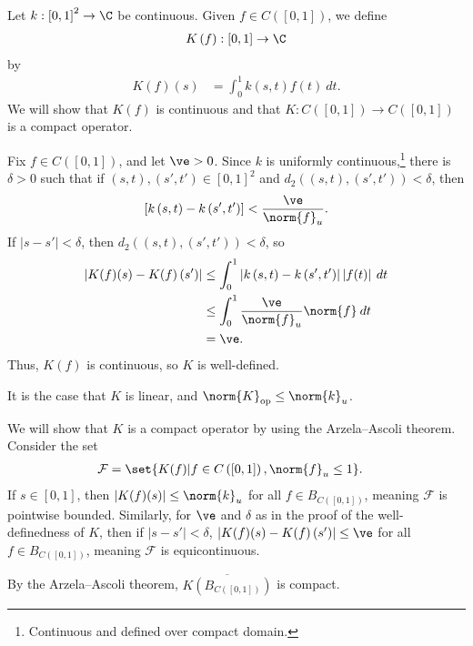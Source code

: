 \documentclass[10pt]{mypackage}
\begin{document}
\begin{example}
  Let $k: \left[0,1\right]^2\rightarrow \C$ be continuous. Given $f\in C\left([0,1]\right)$, we define
  \begin{align*}
    K\left(f\right): \left[0,1\right]\rightarrow \C
  \end{align*}
  by
  \begin{align*}
    K\left(f\right)(s) &= \int_{0}^{1} k\left(s,t\right)f(t)\:dt.
  \end{align*}
  We will show that $K\left(f\right)$ is continuous and that $K:C\left([0,1]\right)\rightarrow C\left([0,1]\right)$ is a compact operator.\newline

  Fix $f\in C\left([0,1]\right)$, and let $\ve > 0$. Since $k$ is uniformly continuous,\footnote{Continuous and defined over compact domain.} there is $\delta > 0$ such that if $\left(s,t\right),\left(s',t'\right)\in \left[0,1\right]^2$ and $d_2\left(\left(s,t\right),\left(s',t'\right)\right) < \delta$, then
  \begin{align*}
    \left[k\left(s,t\right) - k\left(s',t'\right)\right] < \frac{\ve}{\norm{f}_u}.
  \end{align*}
  If $\left\vert s-s' \right\vert < \delta$, then $d_{2}\left(\left(s,t\right),\left(s',t'\right)\right) < \delta$, so
  \begin{align*}
    \left\vert K(f)(s) - K(f)\left(s'\right) \right\vert &\leq \int_{0}^{1} \left\vert k\left(s,t\right)-k\left(s',t'\right) \right\vert\left\vert f(t) \right\vert\:dt\\
                                                         &\leq \int_{0}^{1} \frac{\ve}{\norm{f}_u}\norm{f}\:dt\\
                                                         &= \ve.
  \end{align*}
  Thus, $K(f)$ is continuous, so $K$ is well-defined.\newline

  It is the case that $K$ is linear, and $\norm{K}_{\text{op}}\leq \norm{k}_{u}$.\newline

  We will show that $K$ is a compact operator by using the Arzela--Ascoli theorem. Consider the set
  \begin{align*}
    \mathcal{F} &= \set{K(f)| f\in C\left(\left[0,1\right]\right),\norm{f}_{u}\leq 1}.
  \end{align*}
  If $s\in [0,1]$, then $\left\vert K(f)(s) \right\vert\leq \norm{k}_{u}$ for all $f\in B_{C\left([0,1]\right)}$, meaning $\mathcal{F}$ is pointwise bounded. Similarly, for $\ve $ and $\delta$ as in the proof of the well-definedness of $K$, then if $\left\vert s-s' \right\vert < \delta$, $\left\vert K(f)(s) - K(f)\left(s'\right) \right\vert\leq \ve$ for all $f\in B_{C\left([0,1]\right)}$, meaning $\mathcal{F}$ is equicontinuous.\newline

  By the Arzela--Ascoli theorem, $\overline{K\left(B_{C\left([0,1]\right)}\right)}$ is compact.
\end{example}
\end{document}
